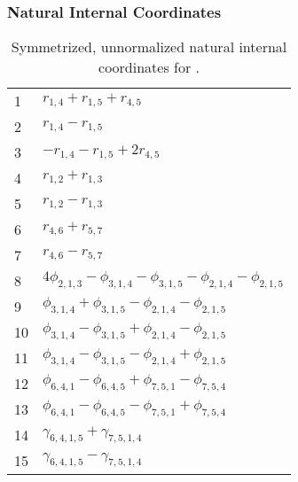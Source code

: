 \documentclass[10pt,oneside]{article}
\begin{document}
\clearpage

\subsubsection*{Natural Internal Coordinates}
\begin{table}[h!]
\centering
\caption{Symmetrized, unnormalized natural internal coordinates for .}
\small
\begin{tabular}{ll}
  1   & $r_{1,4} + r_{1,5} + r_{4,5}$ \\
  2   & $r_{1,4} - r_{1,5}$ \\
  3   & $-r_{1,4} - r_{1,5} + 2r_{4,5}$ \\
  4   & $r_{1,2} + r_{1,3}$ \\
  5   & $r_{1,2} - r_{1,3}$ \\
  6   & $r_{4,6} + r_{5,7}$ \\
  7   & $r_{4,6} - r_{5,7}$ \\
  8   & $4\phi_{2,1,3} - \phi_{3,1,4} - \phi_{3,1,5} - \phi_{2,1,4} - \phi_{2,1,5}$ \\
  9   & $\phi_{3,1,4} + \phi_{3,1,5} - \phi_{2,1,4} - \phi_{2,1,5}$ \\
  10  & $\phi_{3,1,4} - \phi_{3,1,5} + \phi_{2,1,4} - \phi_{2,1,5}$ \\
  11  & $\phi_{3,1,4} - \phi_{3,1,5} - \phi_{2,1,4} + \phi_{2,1,5}$ \\
  12  & $\phi_{6,4,1} - \phi_{6,4,5} + \phi_{7,5,1} - \phi_{7,5,4}$ \\
  13  & $\phi_{6,4,1} - \phi_{6,4,5} - \phi_{7,5,1} + \phi_{7,5,4}$ \\
  14  & $\gamma_{6,4,1,5} + \gamma_{7,5,1,4}$ \\
  15  & $\gamma_{6,4,1,5} - \gamma_{7,5,1,4}$ \\
\end{tabular}
\end{table}

\clearpage

\subsection{\ \ \ }
\end{document}
